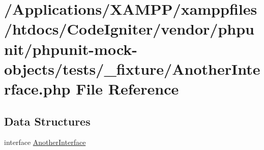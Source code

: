 \hypertarget{_another_interface_8php}{}\section{/\+Applications/\+X\+A\+M\+P\+P/xamppfiles/htdocs/\+Code\+Igniter/vendor/phpunit/phpunit-\/mock-\/objects/tests/\+\_\+fixture/\+Another\+Interface.php File Reference}
\label{_another_interface_8php}
\subsection*{Data Structures}
\begin{DoxyCompactItemize}
\item 
interface \mbox{\hyperlink{interface_another_interface}{Another\+Interface}}
\end{DoxyCompactItemize}
